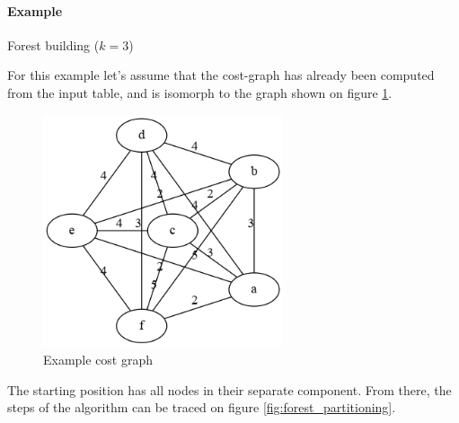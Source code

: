\paragraph{Example} Forest building (\(k=3\)) \label{sec:forest_building_example}

For this example let's assume that the cost-graph has already been computed from the input table, and is isomorph to the graph shown on figure \ref{fig:forest_cost_graph}.

\vspace{\baselineskip}
\begin{figure}[H]
	\centering
	\includegraphics[width=200pt]{../graphs/forest-example-cost.png}
	\caption{Example cost graph}
	\label{fig:forest_cost_graph}
\end{figure}

The starting position has all nodes in their separate component. From there, the steps of the algorithm can be traced on figure \ref{fig:forest_partitioning}.

